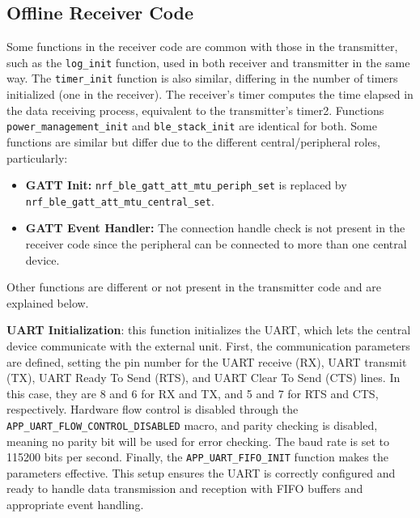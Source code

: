 \documentclass{Configuration_Files/PoliMi3i_thesis}
\begin{document}
\subsection*{Offline Receiver Code}

Some functions in the receiver code are common with those in the transmitter, such as the \texttt{log\_init} function, used in both receiver and transmitter in the same way. The \texttt{timer\_init} function is also similar, differing in the number of timers initialized (one in the receiver). The receiver’s timer computes the time elapsed in the data receiving process, equivalent to the transmitter’s timer2. Functions \texttt{power\_management\_init} and \texttt{ble\_stack\_init} are identical for both. Some functions are similar but differ due to the different central/peripheral roles, particularly:
\begin{itemize}
    \item \textbf{GATT Init:} \texttt{nrf\_ble\_gatt\_att\_mtu\_periph\_set} is replaced by \texttt{nrf\_ble\_gatt\_att\_mtu\_central\_set}.
    \item \textbf{GATT Event Handler:} The connection handle check is not present in the receiver code since the peripheral can be connected to more than one central device.
\end{itemize}

Other functions are different or not present in the transmitter code and are explained below.

\textbf{UART Initialization}: this function initializes the UART, which lets the central device communicate with the external unit. First, the communication parameters are defined, setting the pin number for the UART receive (RX), UART transmit (TX), UART Ready To Send (RTS), and UART Clear To Send (CTS) lines. In this case, they are 8 and 6 for RX and TX, and 5 and 7 for RTS and CTS, respectively. Hardware flow control is disabled through the \texttt{APP\_UART\_FLOW\_CONTROL\_DISABLED} macro, and parity checking is disabled, meaning no parity bit will be used for error checking. The baud rate is set to 115200 bits per second. Finally, the \texttt{APP\_UART\_FIFO\_INIT} function makes the parameters effective. This setup ensures the UART is correctly configured and ready to handle data transmission and reception with FIFO buffers and appropriate event handling.
\end{document}
